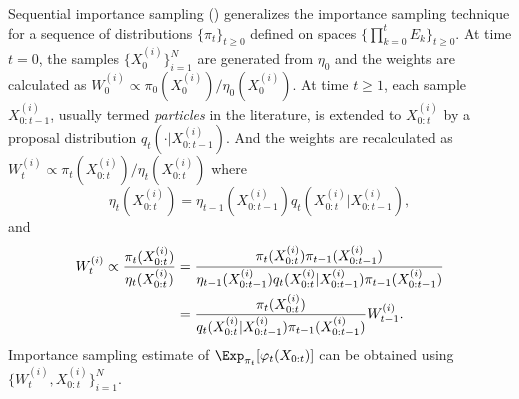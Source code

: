 \documentclass[11pt, fontset=Minion, showoverfull,
bib, mintcode, minted=cache]{marticle}
\begin{document}
Sequential importance sampling (\sis) generalizes the importance sampling
technique for a sequence of distributions $\{\pi_t\}_{t\ge0}$ defined on
spaces $\{\prod_{k=0}^tE_k\}_{t\ge0}$. At time $t = 0$, the samples
$\{X_0^{(i)}\}_{i=1}^N$ are generated from $\eta_0$ and the weights are
calculated as $W_0^{(i)} \propto \pi_0(X_0^{(i)})/\eta_0(X_0^{(i)})$. At time
$t\ge1$, each sample $X_{0:t-1}^{(i)}$, usually termed \emph{particles} in the
literature, is extended to $X_{0:t}^{(i)}$ by a proposal distribution
$q_t(\cdot|X_{0:t-1}^{(i)})$. And the weights are recalculated as $W_t^{(i)}
\propto \pi_t(X_{0:t}^{(i)})/\eta_t(X_{0:t}^{(i)})$ where
\begin{equation}
  \eta_t(X_{0:t}^{(i)}) =
  \eta_{t-1}(X_{0:t-1}^{(i)})q_t(X_{0:t}^{(i)}|X_{0:t-1}^{(i)}),
\end{equation}
and
\begin{align}
  W_t^{(i)} \propto \frac{\pi_t(X_{0:t}^{(i)})}{\eta_t(X_{0:t}^{(i)})}
  &= \frac{\pi_t(X_{0:t}^{(i)})\pi_{t-1}(X_{0:t-1}^{(i)})}
  {\eta_{t-1}(X_{0:t-1}^{(i)})q_t(X_{0:t}^{(i)}|X_{0:t-1}^{(i)})
    \pi_{t-1}(X_{0:t-1}^{(i)})} \notag\\
  &= \frac{\pi_t(X_{0:t}^{(i)})}
  {q_t(X_{0:t}^{(i)}|X_{0:t-1}^{(i)})\pi_{t-1}(X_{0:t-1}^{(i)})}W_{t-1}^{(i)}.
  \label{eq:si}
\end{align}
Importance sampling estimate of $\Exp_{\pi_t}[\varphi_t(X_{0:t})]$ can be
obtained using $\{W_t^{(i)},X_{0:t}^{(i)}\}_{i=1}^N$.
\end{document}
